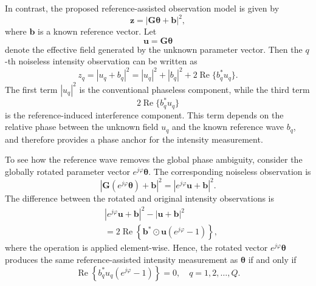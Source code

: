 \documentclass[journal]{IEEEtran}
\begin{document}
In contrast, the proposed reference-assisted observation model is given by
\begin{equation}
\mathbf{z}
=
|\mathbf{G}\boldsymbol{\theta}+\mathbf{b}|^2,
\label{eq:reference_assisted_noiseless}
\end{equation}
where $\mathbf{b}$ is a known reference vector. 
Let
\begin{equation}
\mathbf{u}
=
\mathbf{G}\boldsymbol{\theta}
\end{equation}
denote the effective field generated by the unknown parameter vector. 
Then the $q$-th noiseless intensity observation can be written as
\begin{equation}
z_q
=
|u_q+b_q|^2
=
|u_q|^2
+
|b_q|^2
+
2\operatorname{Re}\{b_q^*u_q\}.
\label{eq:elementwise_reference_expansion}
\end{equation}
The first term $|u_q|^2$ is the conventional phaseless component, while the third term 
\begin{equation}
2\operatorname{Re}\{b_q^*u_q\}
\end{equation}
is the reference-induced interference component. 
This term depends on the relative phase between the unknown field $u_q$ and the known reference wave $b_q$, and therefore provides a phase anchor for the intensity measurement.

To see how the reference wave removes the global phase ambiguity, consider the globally rotated parameter vector $e^{j\varphi}\boldsymbol{\theta}$. 
The corresponding noiseless observation is
\begin{equation}
|\mathbf{G}(e^{j\varphi}\boldsymbol{\theta})+\mathbf{b}|^2
=
|e^{j\varphi}\mathbf{u}+\mathbf{b}|^2.
\end{equation}
The difference between the rotated and original intensity observations is
\begin{equation}
\begin{aligned}
&|e^{j\varphi}\mathbf{u}+\mathbf{b}|^2
-
|\mathbf{u}+\mathbf{b}|^2   \\
&=
2\operatorname{Re}
\left\{
\mathbf{b}^*
\odot
\mathbf{u}
\left(e^{j\varphi}-1\right)
\right\},
\end{aligned}
\label{eq:rotation_difference}
\end{equation}
where the operation is applied element-wise. 
Hence, the rotated vector $e^{j\varphi}\boldsymbol{\theta}$ produces the same reference-assisted intensity measurement as $\boldsymbol{\theta}$ if and only if
\begin{equation}
\operatorname{Re}
\left\{
b_q^*u_q
\left(e^{j\varphi}-1\right)
\right\}
=
0,
\quad
q=1,2,\ldots,Q.
\label{eq:global_rotation_condition}
\end{equation}
\end{document}
